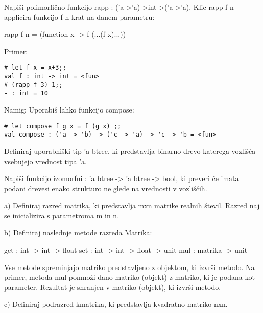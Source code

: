 \begin{ex}
  Napi\v si polimorfi\v cno funkcijo rapp :
  ('a->'a)->int->('a->'a). Klic rapp f n applicira funkcijo f n-krat
  na danem parametru:

  rapp f n = (function x -> f (...(f x)...))     

\noindent\/Primer:            
\begin{verbatim}
# let f x = x+3;; 
val f : int -> int = <fun> 
# (rapp f 3) 1;; 
- : int = 10 

\end{verbatim}

Namig: Uporabi\v s lahko funkcijo compose:

\begin{verbatim}
# let compose f g x = f (g x) ;; 
val compose : ('a -> 'b) -> ('c -> 'a) -> 'c -> 'b = <fun> 
\end{verbatim}

\end{ex} 
\begin{ex}
  Definiraj uporabni\v ski tip 'a btree, ki predstavlja binarno drevo
  katerega vozli\v s\v ca vsebujejo vrednost tipa 'a.

  Napi\v si funkcijo izomorfni : 'a btree -> 'a btree -> bool, ki
  preveri \v ce imata podani drevesi enako strukturo ne glede na
  vrednosti v vozli\v s\v cih.


\end{ex} 
\begin{ex}
  a) Definiraj razred matrika, ki predstavlja mxn matrike realnih \v
  stevil. Razred naj se inicializira s parametroma m in n.

  b) Definiraj naslednje metode razreda Matrika:

  get : int -> int -> float
  set : int -> int -> float -> unit
  mul : matrika -> unit

  Vse metode spreminjajo matriko predstavljeno z objektom, ki izvr\v
  si metodo.  Na primer, metoda mul pomno\v zi dano matriko (objekt) z
  matriko, ki je podana kot parameter. Rezultat je shranjen v matriko
  (objekt), ki izvr\v si metodo.

  c) Definiraj podrazred kmatrika, ki predstavlja kvadratno matriko
  nxn.


\end{ex} 
